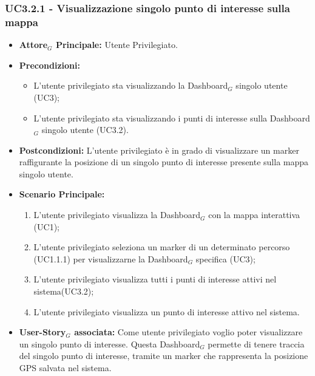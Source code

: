 \documentclass[11pt]{article}
\begin{document}
\begin{justify}
\subsubsection{\textbf{UC3.2.1 - Visualizzazione singolo punto di interesse sulla mappa}}
\label{UC3.2.1}
\begin{itemize}
     \item \textbf{Attore$_G$ Principale:} Utente Privilegiato.
     \item \textbf{Precondizioni:}
        \begin{itemize}
    		\item L'utente privilegiato sta visualizzando la Dashboard$_G$ singolo utente (UC3);
    		\item L'utente privilegiato sta visualizzando i punti di interesse sulla Dashboard$_G$ singolo utente (UC3.2).
        \end{itemize}
     \item \textbf{Postcondizioni:} L'utente privilegiato è in grado di visualizzare un marker raffigurante la posizione di un singolo punto di interesse presente sulla mappa singolo utente.
     \item \textbf{Scenario Principale:}
        \begin{enumerate}
            \item L'utente privilegiato visualizza la Dashboard$_G$ con la mappa interattiva (UC1);
            \item L'utente privilegiato seleziona un marker di un determinato percorso (UC1.1.1) per visualizzarne la Dashboard$_G$ specifica (UC3);
            \item L'utente privilegiato visualizza tutti i punti di interesse attivi nel sistema(UC3.2);
            \item L'utente privilegiato visualizza un punto di interesse attivo nel sistema.
        \end{enumerate}
     \item \textbf{User-Story$_G$ associata:}
     Come utente privilegiato voglio poter visualizzare un singolo punto di interesse. Questa Dashboard$_G$ permette di tenere traccia del singolo punto di interesse, tramite un marker che rappresenta la posizione GPS salvata nel sistema.
\end{itemize}

\end{justify}
\end{document}
